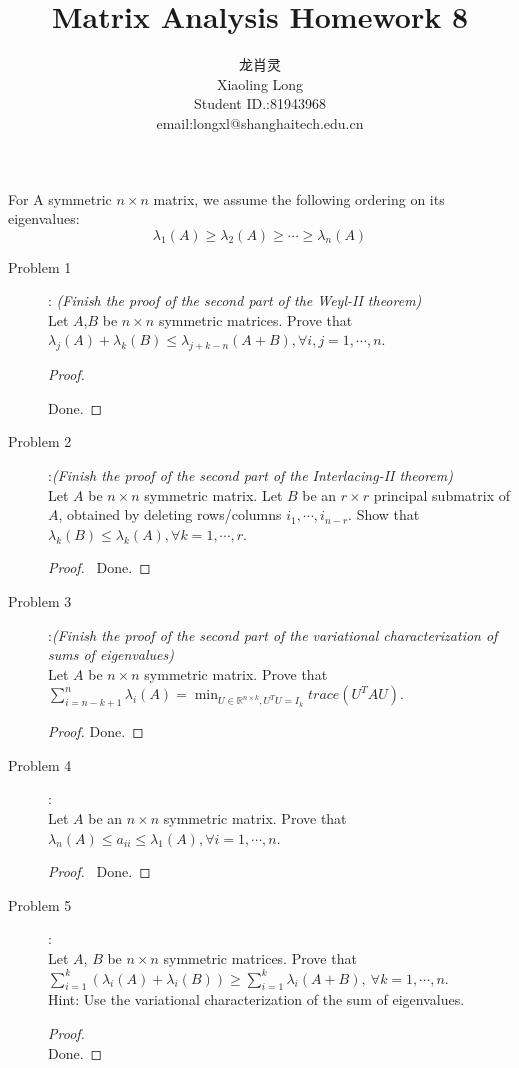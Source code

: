 \documentclass[a4paper]{article}
\title{Matrix Analysis Homework 8}
\author{龙肖灵 \\Xiaoling Long\\Student ID.:81943968\\email:longxl@shanghaitech.edu.cn}
\begin{document}
\maketitle

For A symmetric $n\times n$ matrix, we assume the following ordering on its eigenvalues: $$\lambda_{1}(A)\ge \lambda_{2}(A)\ge \cdots \ge \lambda_{n}(A)$$
\begin{description}
  \item[Problem 1]: \textit{(Finish the proof of the second part of the Weyl-II theorem)}\\
  Let $A$,$B$ be $n\times n$ symmetric matrices. Prove that $\lambda_{j}(A)+\lambda_{k}(B)\le\lambda_{j+k−n}(A+B),\forall i,j=1,\cdots,n$.

  \begin{proof}\

    Done.
  \end{proof}

  \item[Problem 2]:\textit{(Finish the proof of the second part of the Interlacing-II theorem)}\\
   Let $A$ be $n\times n$ symmetric matrix. Let $B$ be an $r\times r$ principal submatrix of $A$, obtained by deleting rows/columns $i_{1},\cdots,i_{n−r}$. Show that $\lambda_{k}(B)\le\lambda_{k}(A),\forall k=1,\cdots,r$.

  \begin{proof}\
    Done.
  \end{proof}

  \item[Problem 3]:\textit{(Finish the proof of the second part of the variational characterization of sums of eigenvalues)}\\
  Let $A$ be $n\times n$ symmetric matrix. Prove that $\sum_{i=n−k+1}^{n}\lambda_{i}(A)=\min_{U\in \mathbb{R}^{n×k},U^{T}U=I_{k}}trace(U^{T}AU)$.

  \begin{proof}

    Done.
  \end{proof}

  \item[Problem 4]:\\
  Let $A$ be an $n\times n$ symmetric matrix. Prove that $\lambda_{n}(A)\le a_{ii}\le \lambda_{1}(A),\forall i=1,\cdots,n$.

  \begin{proof}\
    Done.
  \end{proof}

  \item[Problem 5]:\\
   Let $A$, $B$ be $n\times n$ symmetric matrices. Prove that $\sum^{k}_{i=1}(\lambda_{i}(A)+\lambda_{i}(B))\ge\sum_{i=1}^{k}\lambda_{i}(A+B),\ \forall k=1,\cdots,n$.\\
    Hint: Use the variational characterization of the sum of eigenvalues.

  \begin{proof}\ \\
    Done.
  \end{proof}


\end{description}
\end{document}
